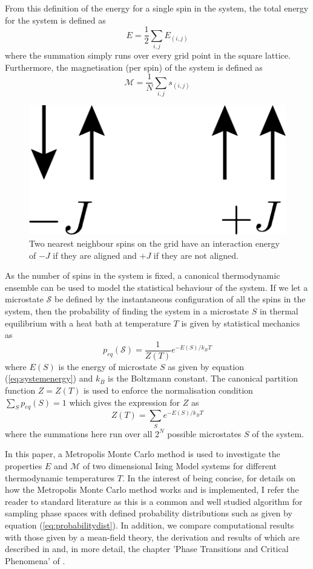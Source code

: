 \documentclass[11pt]{iopart}
\begin{document}
From this definition of the energy for a single spin in the system, the total energy for the system is defined as
\begin{equation}
\label{eq:systemenergy}
E = \frac{1}{2} \sum_{i, j} E_{(i, j)}
\end{equation}
where the summation simply runs over every grid point in the square lattice.
Furthermore, the magnetisation (per spin) of the system is defined as
\begin{equation}
\mathcal{M} = \frac{1}{N} \sum_{i, j} s_{(i, j)}
\end{equation}

\begin{figure}[t]
  \centering
  \includegraphics[width=0.13\linewidth]{images/spins/4x/spins@4x.png}
  \caption{Two nearest neighbour spins on the grid have an interaction energy of $-J$ if they are aligned and $+J$ if they are not aligned.}
  \label{fig:spinalignment}
\end{figure}

As the number of spins in the system is fixed, a canonical thermodynamic ensemble can be used to model the statistical behaviour of the system. If we let a microstate $\mathcal{S}$ be defined by the instantaneous configuration of all the spins in the system, then the probability of finding the system in a microstate $S$ in thermal equilibrium with a heat bath at temperature $T$ is given by statistical mechanics as \cite{statmech} \cite{handout}
\begin{equation}
\label{eq:probabilitydist}
p_{eq}(\mathcal{S}) = \frac{1}{Z(T)} e^{-E(S)/k_B T}
\end{equation}
where $E(S)$ is the energy of microstate $S$ as given by equation (\ref{eq:systemenergy}) and $k_B$ is the Boltzmann constant. The canonical partition function $Z = Z(T)$ is used to enforce the normalisation condition $\sum_S{p_{eq}(S)} = 1$ which gives the expression for $Z$ as
\begin{equation}
Z(T) = \sum_{S} e^{-E(S)/k_B T}
\end{equation}
where the summations here run over all $2^N$ possible microstates $S$ of the system.

In this paper, a Metropolis Monte Carlo method is used to investigate the properties $E$ and $\mathcal{M}$ of two dimensional Ising Model systems for different thermodynamic temperatures $T$. In the interest of being concise, for details on how the Metropolis Monte Carlo method works and is implemented, I refer the reader to standard literature \cite{montecarlo} as this is a common and well studied algorithm for sampling phase spaces with defined probability distributions such as given by equation (\ref{eq:probabilitydist}). In addition, we compare computational results with those given by a mean-field theory, the derivation and results of which are described in \cite{handout} and, in more detail, the chapter 'Phase Transitions and Critical Phenomena' of \cite{meanfield}.
\end{document}
